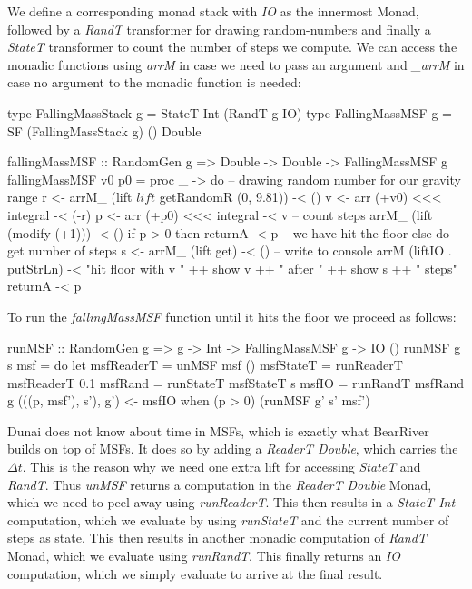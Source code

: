 We define a corresponding monad stack with \textit{IO} as the innermost Monad, followed by a \textit{RandT} transformer for drawing random-numbers and finally a \textit{StateT} transformer to count the number of steps we compute. We can access the monadic functions using \textit{arrM} in case we need to pass an argument and \textit{\_arrM} in case no argument to the monadic function is needed:

\begin{HaskellCode}
type FallingMassStack g = StateT Int (RandT g IO)
type FallingMassMSF g   = SF (FallingMassStack g) () Double

fallingMassMSF :: RandomGen g => Double -> Double -> FallingMassMSF g
fallingMassMSF v0 p0 = proc _ -> do
  -- drawing random number for our gravity range
  r <- arrM_ (lift $ lift $ getRandomR (0, 9.81)) -< ()
  v <- arr (+v0) <<< integral -< (-r)
  p <- arr (+p0) <<< integral -< v
  -- count steps
  arrM_ (lift (modify (+1))) -< ()
  if p > 0
    then returnA -< p
    -- we have hit the floor
    else do
      -- get number of steps
      s <- arrM_ (lift get) -< ()
      -- write to console
      arrM (liftIO . putStrLn) -< "hit floor with v " ++ show v ++ 
                                  " after " ++ show s ++ " steps"
      returnA -< p
\end{HaskellCode}

To run the \textit{fallingMassMSF} function until it hits the floor we proceed as follows:

\begin{HaskellCode}
runMSF :: RandomGen g => g -> Int -> FallingMassMSF g -> IO ()
runMSF g s msf = do
  let msfReaderT = unMSF msf ()
      msfStateT  = runReaderT msfReaderT 0.1
      msfRand    = runStateT msfStateT s
      msfIO      = runRandT msfRand g
  (((p, msf'), s'), g') <- msfIO
  when (p > 0) (runMSF g' s' msf')
\end{HaskellCode}

Dunai does not know about time in MSFs, which is exactly what BearRiver builds on top of MSFs. It does so by adding a \textit{ReaderT Double}, which carries the $\Delta t$. This is the reason why we need one extra lift for accessing \textit{StateT} and \textit{RandT}. Thus \textit{unMSF} returns a computation in the \textit{ReaderT Double} Monad, which we need to peel away using \textit{runReaderT}. This then results in a \textit{StateT Int} computation, which we evaluate by using \textit{runStateT} and the current number of steps as state. This then results in another monadic computation of \textit{RandT} Monad, which we evaluate using \textit{runRandT}. This finally returns an \textit{IO} computation, which we simply evaluate to arrive at the final result.